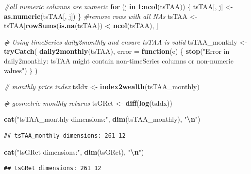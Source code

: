 \documentclass[
  12pt,
]{article}
\newenvironment{Shaded}{\begin{snugshade}}{\end{snugshade}}
\newcommand{\AttributeTok}[1]{\textcolor[rgb]{0.13,0.29,0.53}{#1}}
\newcommand{\CommentTok}[1]{\textcolor[rgb]{0.56,0.35,0.01}{\textit{#1}}}
\newcommand{\ControlFlowTok}[1]{\textcolor[rgb]{0.13,0.29,0.53}{\textbf{#1}}}
\newcommand{\DecValTok}[1]{\textcolor[rgb]{0.00,0.00,0.81}{#1}}
\newcommand{\FunctionTok}[1]{\textcolor[rgb]{0.13,0.29,0.53}{\textbf{#1}}}
\newcommand{\NormalTok}[1]{#1}
\newcommand{\OtherTok}[1]{\textcolor[rgb]{0.56,0.35,0.01}{#1}}
\newcommand{\SpecialCharTok}[1]{\textcolor[rgb]{0.81,0.36,0.00}{\textbf{#1}}}
\newcommand{\StringTok}[1]{\textcolor[rgb]{0.31,0.60,0.02}{#1}}
\begin{document}
\begin{Shaded}
\begin{Highlighting}[]
\CommentTok{\#all numeric columns are numeric}
\ControlFlowTok{for}\NormalTok{ (j }\ControlFlowTok{in} \DecValTok{1}\SpecialCharTok{:}\FunctionTok{ncol}\NormalTok{(tsTAA)) \{}
\NormalTok{  tsTAA[, j] }\OtherTok{\textless{}{-}} \FunctionTok{as.numeric}\NormalTok{(tsTAA[, j])}
\NormalTok{\}}
\CommentTok{\#remove rows with all NAs}
\NormalTok{tsTAA }\OtherTok{\textless{}{-}}\NormalTok{ tsTAA[}\FunctionTok{rowSums}\NormalTok{(}\FunctionTok{is.na}\NormalTok{(tsTAA)) }\SpecialCharTok{\textless{}} \FunctionTok{ncol}\NormalTok{(tsTAA), ]}

\CommentTok{\# Using timeSeries daily2monthly and ensure tsTAA is valid}
\NormalTok{tsTAA\_monthly }\OtherTok{\textless{}{-}} \FunctionTok{tryCatch}\NormalTok{(}
  \FunctionTok{daily2monthly}\NormalTok{(tsTAA),}
  \AttributeTok{error =} \ControlFlowTok{function}\NormalTok{(e) \{}
    \FunctionTok{stop}\NormalTok{(}\StringTok{"Error in daily2monthly: tsTAA might contain non{-}timeSeries columns or non{-}numeric values"}\NormalTok{)}
\NormalTok{  \}}
\NormalTok{)}

\CommentTok{\#  monthly price index}
\NormalTok{tsIdx  }\OtherTok{\textless{}{-}} \FunctionTok{index2wealth}\NormalTok{(tsTAA\_monthly)}

\CommentTok{\# geometric monthly returns}
\NormalTok{tsGRet }\OtherTok{\textless{}{-}} \FunctionTok{diff}\NormalTok{(}\FunctionTok{log}\NormalTok{(tsIdx))}

\FunctionTok{cat}\NormalTok{(}\StringTok{"tsTAA\_monthly dimensions:"}\NormalTok{, }\FunctionTok{dim}\NormalTok{(tsTAA\_monthly), }\StringTok{"}\SpecialCharTok{\textbackslash{}n}\StringTok{"}\NormalTok{)}
\end{Highlighting}
\end{Shaded}

\begin{verbatim}
## tsTAA_monthly dimensions: 261 12
\end{verbatim}

\begin{Shaded}
\begin{Highlighting}[]
\FunctionTok{cat}\NormalTok{(}\StringTok{"tsGRet dimensions:"}\NormalTok{, }\FunctionTok{dim}\NormalTok{(tsGRet), }\StringTok{"}\SpecialCharTok{\textbackslash{}n}\StringTok{"}\NormalTok{)}
\end{Highlighting}
\end{Shaded}

\begin{verbatim}
## tsGRet dimensions: 261 12
\end{verbatim}
\end{document}
